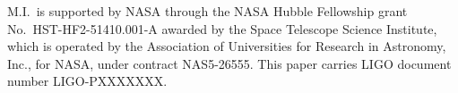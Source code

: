 \documentclass[aps,prd,twocolumn,superscriptaddress,preprintnumbers,floatfix,nofootinbib]{revtex4-2}
\newcommand{\dcc}{LIGO-PXXXXXXX}
\begin{document}
\begin{acknowledgments}
M.I.\ is supported by NASA through the NASA Hubble Fellowship
grant No.\ HST-HF2-51410.001-A awarded by the Space Telescope
Science Institute, which is operated by the Association of Universities
for Research in Astronomy, Inc., for NASA, under contract NAS5-26555.
This paper carries LIGO document number \dcc{}.
\end{acknowledgments}


\end{document}
